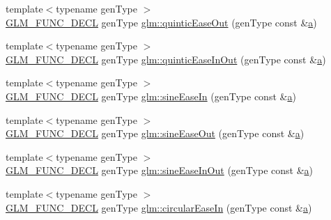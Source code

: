 \begin{DoxyCompactItemize}
\item 
{\footnotesize template$<$typename gen\+Type $>$ }\\\mbox{\hyperlink{setup_8hpp_ab2d052de21a70539923e9bcbf6e83a51}{G\+L\+M\+\_\+\+F\+U\+N\+C\+\_\+\+D\+E\+CL}} gen\+Type \mbox{\hyperlink{group__gtx__easing_ga7dbd4d5c8da3f5353121f615e7b591d7}{glm\+::quintic\+Ease\+Out}} (gen\+Type const \&\mbox{\hyperlink{_s_d_l__opengl__glext_8h_a3309789fc188587d666cda5ece79cf82}{a}})
\item 
{\footnotesize template$<$typename gen\+Type $>$ }\\\mbox{\hyperlink{setup_8hpp_ab2d052de21a70539923e9bcbf6e83a51}{G\+L\+M\+\_\+\+F\+U\+N\+C\+\_\+\+D\+E\+CL}} gen\+Type \mbox{\hyperlink{group__gtx__easing_ga2a82d5c46df7e2d21cc0108eb7b83934}{glm\+::quintic\+Ease\+In\+Out}} (gen\+Type const \&\mbox{\hyperlink{_s_d_l__opengl__glext_8h_a3309789fc188587d666cda5ece79cf82}{a}})
\item 
{\footnotesize template$<$typename gen\+Type $>$ }\\\mbox{\hyperlink{setup_8hpp_ab2d052de21a70539923e9bcbf6e83a51}{G\+L\+M\+\_\+\+F\+U\+N\+C\+\_\+\+D\+E\+CL}} gen\+Type \mbox{\hyperlink{group__gtx__easing_gafb338ac6f6b2bcafee50e3dca5201dbf}{glm\+::sine\+Ease\+In}} (gen\+Type const \&\mbox{\hyperlink{_s_d_l__opengl__glext_8h_a3309789fc188587d666cda5ece79cf82}{a}})
\item 
{\footnotesize template$<$typename gen\+Type $>$ }\\\mbox{\hyperlink{setup_8hpp_ab2d052de21a70539923e9bcbf6e83a51}{G\+L\+M\+\_\+\+F\+U\+N\+C\+\_\+\+D\+E\+CL}} gen\+Type \mbox{\hyperlink{group__gtx__easing_gab3e454f883afc1606ef91363881bf5a3}{glm\+::sine\+Ease\+Out}} (gen\+Type const \&\mbox{\hyperlink{_s_d_l__opengl__glext_8h_a3309789fc188587d666cda5ece79cf82}{a}})
\item 
{\footnotesize template$<$typename gen\+Type $>$ }\\\mbox{\hyperlink{setup_8hpp_ab2d052de21a70539923e9bcbf6e83a51}{G\+L\+M\+\_\+\+F\+U\+N\+C\+\_\+\+D\+E\+CL}} gen\+Type \mbox{\hyperlink{group__gtx__easing_gaa46e3d5fbf7a15caa28eff9ef192d7c7}{glm\+::sine\+Ease\+In\+Out}} (gen\+Type const \&\mbox{\hyperlink{_s_d_l__opengl__glext_8h_a3309789fc188587d666cda5ece79cf82}{a}})
\item 
{\footnotesize template$<$typename gen\+Type $>$ }\\\mbox{\hyperlink{setup_8hpp_ab2d052de21a70539923e9bcbf6e83a51}{G\+L\+M\+\_\+\+F\+U\+N\+C\+\_\+\+D\+E\+CL}} gen\+Type \mbox{\hyperlink{group__gtx__easing_ga34508d4b204a321ec26d6086aa047997}{glm\+::circular\+Ease\+In}} (gen\+Type const \&\mbox{\hyperlink{_s_d_l__opengl__glext_8h_a3309789fc188587d666cda5ece79cf82}{a}})

\end{DoxyCompactItemize}
